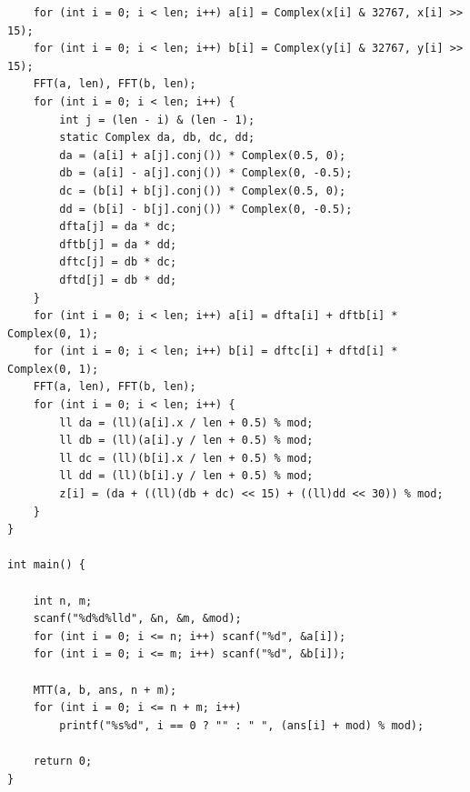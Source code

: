 \documentclass[twoside]{article}
\begin{document}
\begin{lstlisting}
    for (int i = 0; i < len; i++) a[i] = Complex(x[i] & 32767, x[i] >> 15);
    for (int i = 0; i < len; i++) b[i] = Complex(y[i] & 32767, y[i] >> 15);
    FFT(a, len), FFT(b, len);
    for (int i = 0; i < len; i++) {
        int j = (len - i) & (len - 1);
        static Complex da, db, dc, dd;
        da = (a[i] + a[j].conj()) * Complex(0.5, 0);
        db = (a[i] - a[j].conj()) * Complex(0, -0.5);
        dc = (b[i] + b[j].conj()) * Complex(0.5, 0);
        dd = (b[i] - b[j].conj()) * Complex(0, -0.5);
        dfta[j] = da * dc;
        dftb[j] = da * dd;
        dftc[j] = db * dc;
        dftd[j] = db * dd;
    }
    for (int i = 0; i < len; i++) a[i] = dfta[i] + dftb[i] * Complex(0, 1);
    for (int i = 0; i < len; i++) b[i] = dftc[i] + dftd[i] * Complex(0, 1);
    FFT(a, len), FFT(b, len);
    for (int i = 0; i < len; i++) {
        ll da = (ll)(a[i].x / len + 0.5) % mod;
        ll db = (ll)(a[i].y / len + 0.5) % mod;
        ll dc = (ll)(b[i].x / len + 0.5) % mod;
        ll dd = (ll)(b[i].y / len + 0.5) % mod;
        z[i] = (da + ((ll)(db + dc) << 15) + ((ll)dd << 30)) % mod;
    }
}

int main() {

    int n, m;
    scanf("%d%d%lld", &n, &m, &mod);
    for (int i = 0; i <= n; i++) scanf("%d", &a[i]);
    for (int i = 0; i <= m; i++) scanf("%d", &b[i]);

    MTT(a, b, ans, n + m);
    for (int i = 0; i <= n + m; i++)
        printf("%s%d", i == 0 ? "" : " ", (ans[i] + mod) % mod);

    return 0;
}\end{lstlisting}
\end{document}
